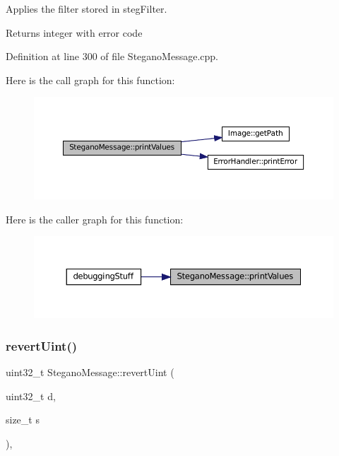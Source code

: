 Applies the filter stored in steg\+Filter. 

\begin{DoxyReturn}{Returns}
integer with error code 
\end{DoxyReturn}


Definition at line 300 of file Stegano\+Message.\+cpp.

Here is the call graph for this function\+:
\nopagebreak
\begin{figure}[H]
\begin{center}
\leavevmode
\includegraphics[width=350pt]{classSteganoMessage_a3ea3f5ff720bf56d33f168d47e2897b0_cgraph}
\end{center}
\end{figure}
Here is the caller graph for this function\+:
\nopagebreak
\begin{figure}[H]
\begin{center}
\leavevmode
\includegraphics[width=350pt]{classSteganoMessage_a3ea3f5ff720bf56d33f168d47e2897b0_icgraph}
\end{center}
\end{figure}
\mbox{\label{classSteganoMessage_a28fdc9b9da4cbbffed718d351da65fd3}} 
\subsubsection{\texorpdfstring{revertUint()}{revertUint()}}
{\footnotesize\ttfamily uint32\+\_\+t Stegano\+Message\+::revert\+Uint (\begin{DoxyParamCaption}\item[{uint32\+\_\+t}]{d,  }\item[{size\+\_\+t}]{s }\end{DoxyParamCaption})\hspace{0.3cm}{\ttfamily [static]}, {\ttfamily [private]}}



